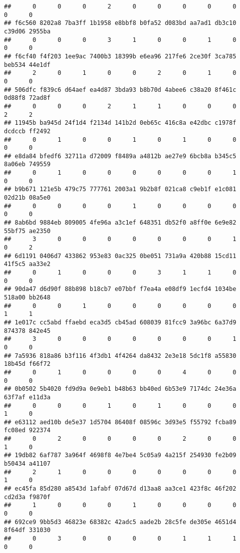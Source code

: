 \documentclass[
]{article}
\begin{document}
\begin{verbatim}
##      0      0      0      2      0      0      0      0      0      0      0 
## f6c560 8202a8 7ba3ff 1b1958 e8bbf8 b0fa52 d083bd aa7ad1 db3c10 c39d06 2955ba 
##      0      0      0      3      1      0      0      1      0      0      0 
## f6cf40 f4f203 1ee9ac 7400b3 18399b e6ea96 217fe6 2ce30f 3ca785 beb534 44e1df 
##      2      0      1      0      0      2      0      1      0      0      0 
## 506dfc f839c6 d64aef ea4d87 3bda93 b8b70d 4abee6 c38a20 8f461c 0d88f8 72ad8f 
##      0      0      0      2      1      1      0      0      0      2      2 
## 11945b ba945d 24f1d4 f2134d 141b2d 0eb65c 416c8a e42dbc c1978f dcdccb ff2492 
##      0      1      0      0      1      0      1      0      0      0      0 
## e8da84 bfedf6 32711a d72009 f8489a a4812b ae27e9 6bcb8a b345c5 8a06eb 749559 
##      0      1      0      0      0      0      0      0      1      0      0 
## b9b671 121e5b 479c75 777761 2003a1 9b2b8f 021ca8 c9eb1f e1c081 02d21b 08a5e0 
##      0      0      0      0      1      0      0      0      0      0      0 
## 8ab6bd 9884eb 809005 4fe96a a3c1ef 648351 db52f0 a8ff0e 6e9e82 55bf75 ae2350 
##      3      0      0      0      0      0      0      0      1      0      2 
## 6d1191 0406d7 433862 953e83 0ac325 0be051 731a9a 420b88 15cd11 41f5c5 aa33e2 
##      0      1      0      0      0      3      1      1      0      0      0 
## 90da47 d6d90f 88b898 b18cb7 e07bbf f7ea4a e08df9 1ecfd4 1034be 518a00 bb2648 
##      0      0      1      0      0      0      0      0      0      1      1 
## 1e017c cc5abd ffaebd eca3d5 cb45ad 608039 81fcc9 3a96bc 6a37d9 874378 842e45 
##      3      0      0      0      0      0      0      0      1      0      0 
## 7a5936 818a86 b3f116 4f3db1 4f4264 da8432 2e3e18 5dc1f8 a55830 18b45d f66f72 
##      0      1      0      0      0      0      4      0      0      0      0 
## 0b0502 5b4020 fd9d9a 0e9eb1 b48b63 bb40ed 6b53e9 7174dc 24e36a 63f7af e11d3a 
##      0      0      0      1      0      1      0      0      0      1      0 
## e63112 aed10b de5e37 1d5704 86408f 08596c 3d93e5 f55792 fcba89 fc08ed 922374 
##      0      2      0      0      0      0      2      0      0      1      0 
## 19db82 6af787 3a964f 4698f8 4e7be4 5c05a9 4a215f 254930 fe2b09 b50434 a41107 
##      2      1      0      0      0      0      0      0      0      1      0 
## ec45fa 85d280 a8543d 1afabf 07d67d d13aa8 aa3ce1 423f8c 46f202 cd2d3a f9870f 
##      1      0      0      0      1      0      0      0      0      0      0 
## 692ce9 9bb5d3 46823e 68382c 42adc5 aade2b 28c5fe de305e 4651d4 8f64df 331030 
##      0      3      0      0      0      0      1      1      1      0      0 

\end{verbatim}
\end{document}
